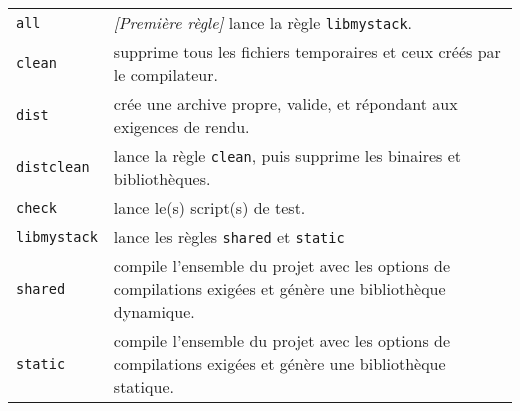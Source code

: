 \bigskip

\begin{tabular}{l p{13cm}}
\texttt{all} & \textit{[Première règle]} lance la règle \texttt{libmystack}.\\
\texttt{clean} & supprime tous les fichiers temporaires et ceux créés par le compilateur.\\
\texttt{dist} & crée une archive propre, valide, et répondant aux exigences de rendu.\\
\texttt{distclean} & lance la règle \texttt{clean}, puis supprime les binaires et bibliothèques.\\
\texttt{check} & lance le(s) script(s) de test.\\
\texttt{libmystack} & lance les règles \texttt{shared} et \texttt{static} \\
\texttt{shared} & compile l'ensemble du projet avec les options de compilations exigées et génère une bibliothèque dynamique.\\
\texttt{static} & compile l'ensemble du projet avec les options de compilations exigées et génère une bibliothèque statique.\\
\end{tabular}
